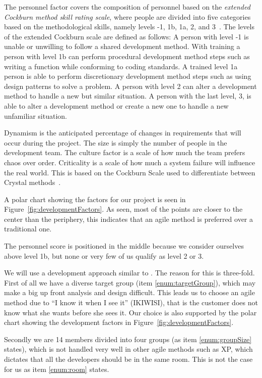 The personnel factor covers the composition of personnel based on the \textit{extended Cockburn method skill rating scale}, where people are divided into five categories based on the methodological skills, namely levels -1, 1b, 1a, 2, and 3~\cite[p.~34]{boehmTurner}.
The levels of the extended Cockburn scale are defined as follows:
A person with level -1 is unable or unwilling to follow a shared development method.
With training a person with level 1b can perform procedural development method steps such as writing a function while conforming to coding standards.
A trained level 1a person is able to perform discretionary development method steps such as using design patterns to solve a problem.
A person with level 2 can alter a development method to handle a new but similar situation.
A person with the last level, 3, is able to alter a development method or create a new one to handle a new unfamiliar situation.

Dynamism is the anticipated percentage of changes in requirements that will occur during the project.
The size is simply the number of people in the development team.
The culture factor is a scale of how much the team prefers chaos over order.
Criticality is a scale of how much a system failure will influence the real world.
This is based on the Cockburn Scale used to differentiate between Crystal methods~\cite[pp.~36-37]{Larman04}.



A polar chart showing the factors for our project is seen in Figure~\ref{fig:developmentFactors}.
As seen, most of the points are closer to the center than the periphery, this indicates that an agile method is preferred over a traditional one.

The personnel score is positioned in the middle because we consider ourselves above level 1b, but none or very few of us qualify as level 2 or 3.


We will use a development approach similar to \sos{}.
The reason for this is three-fold.
First of all we have a diverse target group (item \ref{enum:targetGroup}), which may make a big up front analysis and design difficult.
This leads us to choose an agile method due to ``I know it when I see it'' (IKIWISI), that is the customer does not know what she wants before she sees it.
Our choice is also supported by the polar chart showing the development factors in Figure~\ref{fig:developmentFactors}.

Secondly we are 14 members divided into four groups (as item \ref{enum:groupSize} states), which is not handled very well in other agile methods such as XP, which dictates that all the developers should be in the same room. 
This is not the case for us as item \ref{enum:room} states.

